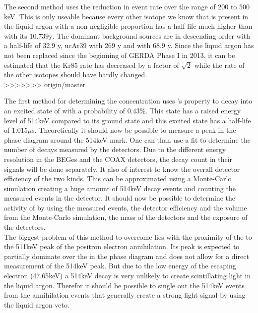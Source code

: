 The second method uses the reduction in event rate over the range of 200 to 500 keV. This is only useable because every other isotope we know that is present in the liquid argon with a non negligible proportion has a half-life much higher than  with its \(10.739\mathrm{y}\). The dominant background sources are in descending order  with a half-life of 32.9 y, \n uc{Ar}{39} with 269 y and  with 68.9 y. Since the liquid argon has not been replaced since the beginning of GERDA Phase I in 2013, it can be estimated that the Kr85 rate has decreased by a factor of \(\sqrt{2}\) while the rate of the other isotopes should have hardly changed.\\
>>>>>>> origin/master

The first method for determining the concentration uses 's property to decay into an excited state of  with a probability of 0.43\%. This state has a raised energy level of 514keV compared to its ground state and this excited state has a half-life of 1.015\(\mu\)s. Theoretically it should now be possible to measure a peak in the phase diagram around the 514keV mark. One can than use a fit to determine the number of decays measured by the detectors. Due to the different energy resolution in the BEGes and the COAX detectors, the decay count in their signals will be done separately. It also of interest to know the overall detector efficiency of the two kinds. This can be approximated using a Monte-Carlo simulation creating a huge amount of 514keV decay events and counting the measured events in the detector. It should now be possible to determine the activity of  by using the measured events, the detector efficiency and the volume from the Monte-Carlo simulation, the mass of the detectors and the exposure of the detectors.\\

The biggest problem of this method to overcome lies with the proximity of the  to the 511keV peak of the positron electron annihilation. Its peak is expected to partially dominate over the  in the phase diagram and does not allow for a direct measurement of the 514keV peak. But due to the low energy of the escaping electron (47.65keV) a 514keV decay is very unlikely to create scintillating light in the liquid argon. Therefor it should be possible to single out the 514keV events from the annihilation events that generally create a strong light signal by using the liquid argon veto.\\

